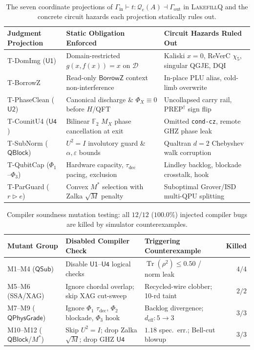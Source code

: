 \documentclass[acmsmall,screen,anonymous]{acmart}
\DeclareRobustCommand{\_}{\ifmmode\text{\char95}\else\char95\penalty0\relax\fi}
\theoremstyle{plain}
\newcommand{\LakefillQ}{\textsc{LakefillQ}}
\newcommand{\QSub}{\ensuremath{\mathsf{QSub}}}
\newcommand{\QPhysGrade}{\ensuremath{\mathsf{QPhysGrade}}}
\newcommand{\QBlock}{\ensuremath{\mathsf{QBlock}}}
\newcommand{\CapBorrowZ}{\ensuremath{\mathsf{BorrowZ}}}
\begin{document}
\begin{table}[ht]
\centering
\caption{The seven coordinate projections of $\Gamma_{\mathrm{in}} \vdash t : \mathcal{Q}_{e}(A) \dashv \Gamma_{\mathrm{out}}$ in \LakefillQ{} and the concrete circuit hazards each projection statically rules out.}
\label{tab:t17b}
\footnotesize
\setlength{\tabcolsep}{4pt}
\begin{tabular}{lll}
\toprule
Judgment Projection & Static Obligation Enforced & Circuit Hazards Ruled Out \\
\midrule
\textsf{T-DomImg} ($\mathsf{U1}$) & Domain-restricted $g(x,f(x))=x$ on $\mathcal{D}$ & Kaliski $x=0$, ReVerC $\chi_5$, singular QGJE, DQI \\
\textsf{T-BorrowZ} & Read-only $\CapBorrowZ$ context non-interference & In-place PLU alias, cold-limb overwrite \\
\textsf{T-PhaseClean} ($\mathsf{U2}$) & Canonical discharge \& $\Phi_X \equiv 0$ before $H$/QFT & Uncollapsed carry rail, $\mathrm{PREP}^\dagger$ sign flip \\
\textsf{T-CounitU4} ($\mathsf{U4}$) & Bilinear $\mathbb{F}_2$ $M_X$ phase cancellation at exit & Omitted \texttt{cond-cz}, remote GHZ phase leak \\
\textsf{T-SubNorm} ($\QBlock$) & $U^2 = I$ involutory guard \& $\alpha, \varepsilon$ bounds & Qualtran $d=2$ Chebyshev walk corruption \\
\textsf{T-QubitCap} ($\Phi_1$--$\Phi_3$) & Hardware capacity, $\tau_{\mathrm{dec}}$ pacing, exclusion & Lindley backlog, blockade crosstalk, hook \\
\textsf{T-ParGuard} ($r \triangleright e$) & Convex $M^*$ selection with Zalka $\sqrt{M}$ penalty & Suboptimal Grover/ISD multi-QPU splitting \\
\bottomrule
\end{tabular}
\end{table}

\begin{table}[ht]
\centering
\caption{Compiler soundness mutation testing: all $12/12$ ($100.0\%$) injected compiler bugs are killed by simulator counterexamples.}
\label{tab:t16}
\footnotesize
\setlength{\tabcolsep}{4pt}
\begin{tabular}{lllr}
\toprule
Mutant Group & Disabled Compiler Check & Triggering Counterexample & Killed \\
\midrule
M1--M4 ($\QSub$) & Disable $\mathsf{U1}$--$\mathsf{U4}$ logical checks & $\operatorname{Tr}(\rho^2) \le 0.50$ / norm leak & $4/4$ \\
M5--M6 (SSA/XAG) & Ignore chordal overlap; skip XAG cut-sweep & Recycled-wire clobber; 10-rd taint & $2/2$ \\
M7--M9 ($\QPhysGrade$) & Ignore $\Phi_1$ $\tau_{\mathrm{dec}}$, $\Phi_2$ blockade, $\Phi_3$ hook & Backlog divergence; $d_{\mathrm{eff}}: 5 \to 3$ & $3/3$ \\
M10--M12 ($\QBlock$/$M^*$) & Skip $U^2=I$; drop Zalka $\sqrt{M}$; drop GHZ $\mathsf{U4}$ & $1.18$ spec.\ err.; Bell-cut blowup & $3/3$ \\
\bottomrule
\end{tabular}
\end{table}
\end{document}
